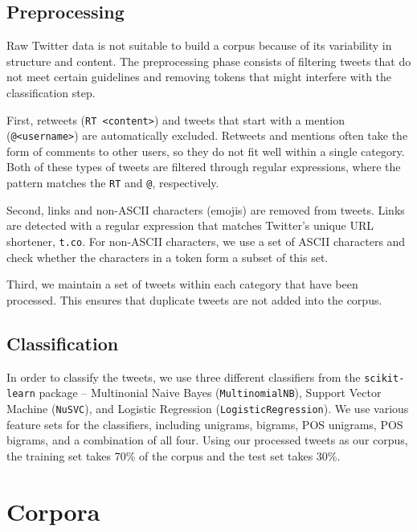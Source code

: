 \documentclass[twocolumn]{article}
\begin{document}
\subsection{Preprocessing}

Raw Twitter data is not suitable to build a corpus because of its variability in structure and content. The preprocessing phase consists of filtering tweets that do not meet certain guidelines and removing tokens that might interfere with the classification step.

First, retweets (\texttt{RT <content>}) and tweets that start with a mention (\texttt{@<username>}) are automatically excluded. Retweets and mentions often take the form of comments to other users, so they do not fit well within a single category. Both of these types of tweets are filtered through regular expressions, where the pattern matches the \texttt{RT} and \texttt{@}, respectively.

Second, links and non-ASCII characters (emojis) are removed from tweets. Links are detected with a regular expression that matches Twitter’s unique URL shortener, \texttt{t.co}. For non-ASCII characters, we use a set of ASCII characters and check whether the characters in a token form a subset of this set.

Third, we maintain a set of tweets within each category that have been processed. This ensures that duplicate tweets are not added into the corpus.

\subsection{Classification}

In order to classify the tweets, we use three different classifiers from the \texttt{scikit-learn} \cite{scikit} package – Multinonial Naive Bayes (\texttt{MultinomialNB}), Support Vector Machine (\texttt{NuSVC}), and Logistic Regression (\texttt{LogisticRegression}). We use various feature sets for the classifiers, including unigrams, bigrams, POS unigrams, POS bigrams, and a combination of all four. Using our processed tweets as our corpus, the training set takes 70\% of the corpus and the test set takes 30\%.

\section{Corpora}
\end{document}
